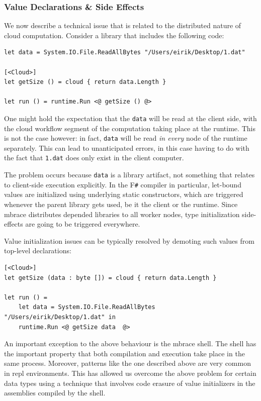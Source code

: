 \documentclass[9pt,a4paper]{article}
\newcommand{\mbrace}{mbrace}
\newcommand{\fsharp}{F\texttt \#}
\begin{document}
\subsubsection*{Value Declarations \& Side Effects}

We now describe a technical issue that is related to the distributed nature of cloud computation.
Consider a library that includes the following code:
\begin{lstlisting}
let data = System.IO.File.ReadAllBytes "/Users/eirik/Desktop/1.dat"

[<Cloud>]
let getSize () = cloud { return data.Length }

let run () = runtime.Run <@ getSize () @>
\end{lstlisting}
One might hold the expectation that the \texttt{data} will be read at the client side,
with the cloud workflow segment of the computation taking place at the runtime.
This is not the case however: in fact, \texttt{data} will be read \emph{in every}
node of the runtime separately. This can lead to unanticipated errors, in this case
having to do with the fact that \texttt{1.dat} does only exist in the client computer.

The problem occurs because \texttt{data} is a library artifact, not something
that relates to client-side execution explicitly. In the \fsharp{} compiler in particular,
let-bound values are initialized using underlying static constructors, which are triggered
whenever the parent library gets used, be it the client or the runtime.
Since \mbrace{} distributes depended libraries to all worker nodes, type initialization 
side-effects are going to be triggered everywhere.

Value initialization issues can be typically resolved by demoting such values from top-level
declarations:
\begin{lstlisting}
[<Cloud>]
let getSize (data : byte []) = cloud { return data.Length }

let run () = 
    let data = System.IO.File.ReadAllBytes "/Users/eirik/Desktop/1.dat" in
    runtime.Run <@ getSize data  @>
\end{lstlisting}

An important exception to the above behaviour is the \mbrace{} shell. The shell has the 
important property that both compilation and execution take place in the same process. 
Moreover, patterns like the one described above are very common in repl environments.
This has allowed us overcome the above problem for certain data types using a technique
that involves code erasure of value initializers in the assemblies compiled by the shell.
\end{document}
